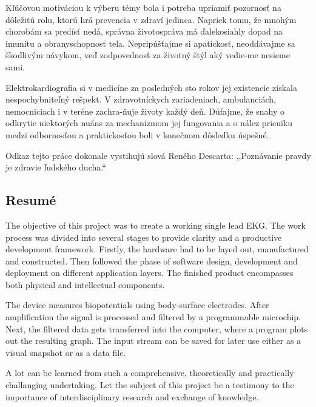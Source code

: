 \documentclass[titlepage,12pt]{article}
\begin{document}
Kľúčovou motiváciou k výberu témy bola i potreba upriamiť pozornosť na dôležitú rolu, ktorú hrá prevencia v zdraví jedinca. Napriek tomu, že mnohým chorobám sa predísť nedá, správna životospráva má ďalekosiahly dopad na imunitu a obranyschopnosť tela. Nepripúšťajme \linebreak si apatickosť, neoddávajme sa škodlivým návykom, veď zodpovednosť za životný štýl aký vedie-me nesieme sami.

Elektrokardiografia si v medicíne za posledných sto rokov jej existencie získala nespochybniteľný rešpekt. V zdravotníckych zariadeniach, ambulanciách, nemocniciach i v teréne zachra-ňuje životy každý deň. Dúfajme, že snahy o odkrytie niektorých nuáns za mechanizmom jej fungovania a o nález prieniku medzi odbornosťou a praktickosťou boli v konečnom dôsledku úspešné. 

Odkaz tejto práce dokonale vystihujú slová Reného Descarta: ,,Poznávanie pravdy je zdravie ľudského ducha.“

\subsection*{Resumé}
The objective of this project was to create a working single lead EKG. The work process was divided into several stages to provide clarity and a productive development framework. Firstly, the hardware had to be layed out, manufactured and constructed. Then followed the phase of software design, development and deployment on different application layers. The finished product encompasses both physical and intellectual components.

The device measures biopotentials using body-surface electrodes. After amplification the signal is processed and filtered by a programmable microchip. Next, the filtered data gets transferred into the computer, where a program plots out the resulting graph. The input stream can be saved for later use either as a visual snapshot or as a data file.

A lot can be learned from such a comprehensive, theoretically and practically challanging undertaking. Let the subject of this project be a testimony to the importance of interdisciplinary research and exchange of knowledge.





\newpage
\end{document}
